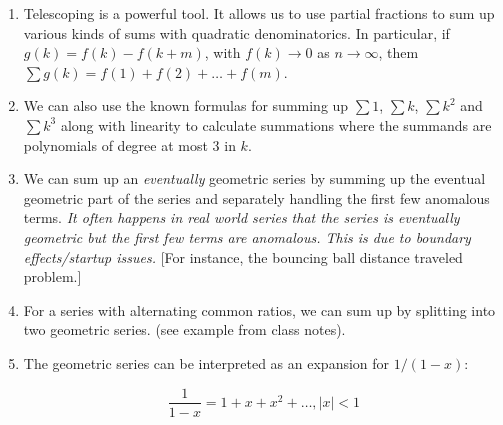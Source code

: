 \documentclass[10pt]{amsart}
\begin{document}
\begin{enumerate}
\item Telescoping is a powerful tool. It allows us to use partial
  fractions to sum up various kinds of sums with quadratic
  denominatorics. In particular, if $g(k) = f(k) - f(k + m)$, with
  $f(k) \to 0$ as $n \to \infty$, them $\sum g(k) = f(1) + f(2) +
  \dots + f(m)$.
\item We can also use the known formulas for summing up $\sum 1$,
  $\sum k$, $\sum k^2$ and $\sum k^3$ along with linearity to
  calculate summations where the summands are polynomials of degree at
  most $3$ in $k$.
\item We can sum up an {\em eventually} geometric series by summing up
  the eventual geometric part of the series and separately handling
  the first few anomalous terms. {\em It often happens in real world
  series that the series is eventually geometric but the first few
  terms are anomalous. This is due to boundary effects/startup
  issues.} [For instance, the bouncing ball distance traveled problem.]
\item For a series with alternating common ratios, we can sum up by
  splitting into two geometric series. (see example from class notes).
\item The geometric series can be interpreted as an expansion for $1/(1 - x)$:

  $$\frac{1}{1 - x} = 1 + x + x^2 + \dots, |x| < 1$$


\end{enumerate}
\end{document}
